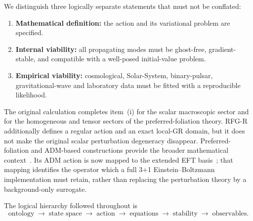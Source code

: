 \documentclass[11pt,a4paper]{article}
\begin{document}
We distinguish three logically separate statements that must not be conflated:

\begin{enumerate}[label=(\roman*)]
\item \textbf{Mathematical definition:} the action and its variational problem are specified.
\item \textbf{Internal viability:} all propagating modes must be ghost-free, gradient-stable, and compatible with a well-posed initial-value problem.
\item \textbf{Empirical viability:} cosmological, Solar-System, binary-pulsar, gravitational-wave and laboratory data must be fitted with a reproducible likelihood.
\end{enumerate}

The original calculation completes item~(i) for the scalar macroscopic sector and for the homogeneous and tensor sectors of the preferred-foliation theory. RFG-R additionally defines a regular action and an exact local-GR domain, but it does not make the original scalar perturbation degeneracy disappear. Preferred-foliation and ADM-based constructions provide the broader mathematical context~\cite{ADM,JacobsonMattingly,Horava,BlasPujolasSibiryakov}. Its ADM action is now mapped to the extended EFT basis~\cite{ExtendedEFTMap}; that mapping identifies the operator which a full 3+1 Einstein--Boltzmann implementation must retain, rather than replacing the perturbation theory by a background-only surrogate.

The logical hierarchy followed throughout is
\[
\text{ontology}\;\longrightarrow\;
\text{state space}\;\longrightarrow\;
\text{action}\;\longrightarrow\;
\text{equations}\;\longrightarrow\;
\text{stability}\;\longrightarrow\;
\text{observables}.
\]

\begin{table}[H]
\centering
\caption{Scope comparison for the constructions in this paper. ``Defined'' is not a data fit, and an entry for a particular sector does not imply health of every perturbative sector.}
\label{tab:comparison}
\end{table}
\end{document}
